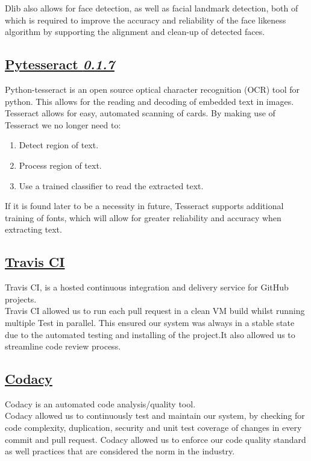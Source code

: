 \documentclass{article}
\begin{document}
		\noindent
		Dlib also allows for face detection, as well as facial landmark 
		detection, both of which is required to improve the
		accuracy and reliability of the face likeness algorithm by supporting
		the alignment and clean-up of detected faces.

		\subsection{\href{https://pypi.python.org/pypi/pytesseract}
		{Pytesseract \textit{0.1.7}}}
		Python-tesseract is an open source optical 
		character recognition (OCR) tool for python. This allows 
		for the reading and decoding of embedded text in images.\\

		\noindent
		Tesseract allows for easy, automated scanning of cards. By making use
		of Tesseract we no longer need to:
		\begin{enumerate}
			\item Detect region of text.
			\item Process region of text.
			\item Use a trained classifier to read the extracted text.
		\end{enumerate}
		If it is found later to be a necessity in future, Tesseract supports
		additional training of fonts, which will allow for greater
		reliability and accuracy when extracting text.

		\subsection{\href{https://travis-ci.org}
		{Travis CI}}
		Travis CI, is a hosted continuous integration and delivery service for GitHub projects.\\	

		\noindent
		Travis CI allowed us to run each pull request in a clean VM build whilst running multiple Test in parallel.
		This ensured our system was always in a stable state due to the automated testing and installing of the 					project.It also allowed us to streamline code review process.

		\subsection{\href{https://www.codacy.com}
		{Codacy}}
		Codacy is an automated code analysis/quality tool.\\

		\noindent
		Codacy allowed us to continuously test and maintain our system, by checking for code complexity,
		duplication, security and unit test coverage of changes in every commit and pull request.
		Codacy allowed us to enforce our code quality standard as well practices
		that are considered the norm in the industry.
\end{document}
